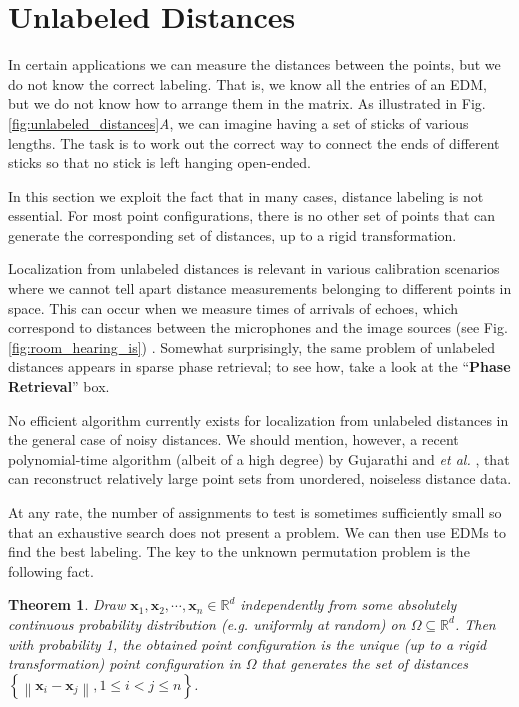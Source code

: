 \documentclass[10pt,double]{IEEEtran}
\newtheorem{thm}{Theorem}
\providecommand{\R}{\ensuremath{\mathbb{R}}}
\providecommand{\norm}[1]{\left\lVert#1\right\rVert}
\providecommand{\set}[1]{\left\{#1\right\}}
\renewcommand{\vec}[1]{\ensuremath{\boldsymbol{#1}}}
\providecommand{\vx}{\vec{x}} \providecommand{\vy}{\vec{y}}
\newcommand{\rev}[1]{{#1}}
\begin{document}
\section{Unlabeled Distances} \label{sec:unlabeled_distances}

In certain applications we can measure the distances between the points, but
we do not know the correct labeling. That is, we know all the entries of an
EDM, but we do not know how to arrange them in the matrix. As illustrated in
Fig. \ref{fig:unlabeled_distances}\textsl{A}, we can imagine having a set of
sticks of various lengths. The task is to work out the correct way to connect
the ends of different sticks so that no stick is left hanging open-ended.

In this section we exploit the fact that in many cases, distance labeling is
not essential. For most point configurations, there is no other set of points
that can generate the corresponding set of distances, up to a rigid
transformation.

Localization from unlabeled distances is relevant in various calibration
scenarios where we cannot tell apart distance measurements belonging to
different points in space. This can occur when we measure times of arrivals of
echoes, which correspond to distances between the microphones and the image
sources (see Fig. \ref{fig:room_hearing_is})
\cite{Dokmanic:2014tc, Dokmanic:2013dz}. Somewhat surprisingly, the same
problem of unlabeled distances appears in sparse phase retrieval; to see how,
take a look at the ``\textbf{Phase Retrieval}'' box.

No efficient algorithm currently exists for localization from unlabeled
distances in the general case of noisy distances. \rev{We should mention,
however, a recent polynomial-time algorithm (albeit of a high degree) by
Gujarathi and \emph{et al.} \cite{Gujarathi:2014cz}, that can reconstruct
relatively large point sets from unordered, noiseless distance data.}

At any rate, the number of assignments to test is sometimes sufficiently small
so that an exhaustive search does not present a problem. We can then use EDMs
to find the best labeling. The key to the unknown permutation problem is the
following fact.

\begin{thm}
	\label{thm:unlabeled}
  Draw $\vx_1, \vx_2, \cdots, \vx_n \in \R^d$ independently from some
  absolutely continuous probability distribution (\emph{e.g.} uniformly at
  random) on $\Omega \subseteq \R^d$. Then with probability 1, the obtained
  point configuration is the unique \rev{(up to a rigid transformation)} point
  configuration in $\Omega$ that generates the set of distances
  $\set{\norm{\vx_i -	\vx_j}, 1 \leq i < j \leq n}$.
\end{thm}
\end{document}
